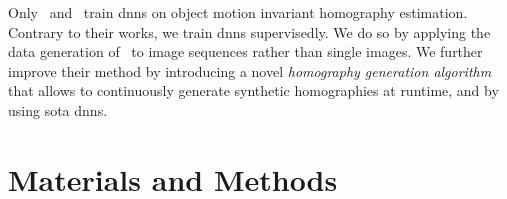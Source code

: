 Only~\cite{le2020deep} and~\cite{zhang2019content} train \gls{dnn}s on object motion invariant homography estimation. Contrary to their works, we train \gls{dnn}s supervisedly. We do so by applying the data generation of~\cite{detone2016deep} to image sequences rather than single images. We further improve their method by introducing a novel \textit{homography generation algorithm} that allows to continuously generate synthetic homographies at runtime, and by using \gls{sota} \gls{dnn}s.

\section{Materials and Methods}


